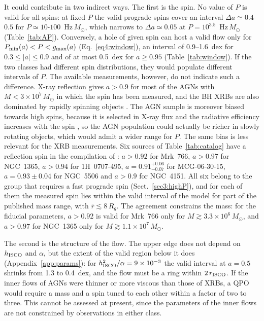 It could contribute in two indirect ways.
The first is the spin.
No value of $P$ is valid for all spins: at fixed $P$ the valid prograde spins cover an interval $\Delta a\simeq0.4$-$0.5$ for $P\simeq10$-$100$~Hz\,$M_\odot$, which narrows to $\Delta a\simeq0.05$ at $P=10^{3.5}$~Hz\,$M_\odot$ (Table~\ref{tab:AP}).
Conversely, a hole of given spin can host a valid flow only for $P_\textup{min}(a)<P<g_\textup{max}(a)$ (Eq.~\ref{eq4:window}), an interval of 0.9--1.6~dex for $0.3\leq|a|\leq0.9$ and of at most 0.5~dex for $a\geq0.95$ (Table~\ref{tab:window}).
If the two classes had different spin distributions, they would populate different intervals of $P$.
The available measurements, however, do not indicate such a difference.
X-ray reflection gives $a>0.9$ for most of the AGNs with $M<3\times10^7\,M_\odot$ in which the spin has been measured, and the BH XRBs are also dominated by rapidly spinning objects \citep{Reynolds2021}.
The AGN sample is moreover biased towards high spins, because it is selected in X-ray flux and the radiative efficiency increases with the spin \citep{Reynolds2021}, so the AGN population could actually be richer in slowly rotating objects, which would admit a wider range for $P$.
The same bias is less relevant for the XRB measurements.
Six sources of Table~\ref{tab:catalog} have a reflection spin in the compilation of \citet{Reynolds2021}: $a>0.92$ for Mrk~766, $a>0.97$ for NGC~1365, $a>0.94$ for 1H~0707-495, $a=0.91^{+0.06}_{-0.07}$ for MCG-06-30-15, $a=0.93\pm0.04$ for NGC~5506 and $a>0.9$ for NGC~4151.
All six belong to the group that requires a fast prograde spin (Sect.~\ref{sec3:highP}), and for each of them the measured spin lies within the valid interval of the model for part of the published mass range, with $\bar r\lesssim8\,R_g$.
The agreement constrains the mass: for the fiducial parameters, $a>0.92$ is valid for Mrk~766 only for $M\gtrsim3.3\times10^6\,M_\odot$, and $a>0.97$ for NGC~1365 only for $M\gtrsim1.1\times10^7\,M_\odot$.

The second is the structure of the flow.
The upper edge does not depend on $h_\textup{ISCO}$ and $\alpha$, but the extent of the valid region below it does (Appendix~\ref{app:params}): for $h_\textup{ISCO}^2/\alpha=9\times10^{-3}$ the valid interval at $a=0.5$ shrinks from 1.3 to 0.4~dex, and the flow must be a ring within $2\,r_\textup{ISCO}$.
If the inner flows of AGNs were thinner or more viscous than those of XRBs, a QPO would require a mass and a spin tuned to each other within a factor of two to three.
This cannot be assessed at present, since the parameters of the inner flows are not constrained by observations in either class.

